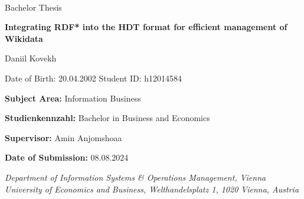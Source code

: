 \AddToShipoutPicture*{\BackgroundPic}
\thispagestyle{fancy}
{\vspace{2cm}~}
{\vspace{2cm}}

{\noindent\large Bachelor Thesis}
\vspace{1cm}

{\noindent\huge\textbf{Integrating RDF* into the HDT format for efficient management of Wikidata}}
\bigskip

{\noindent\LARGE Daniil Kovekh}
\bigskip

{\noindent\small Date of Birth: 20.04.2002}
{\noindent\small Student ID: h12014584}
\bigskip

{\vspace{2cm}}

{\noindent\large {\bf Subject Area:} Information Business}
\bigskip

{\noindent\large {\bf Studienkennzahl:} Bachelor in Business and Economics}
\bigskip

{\noindent\large {\bf Supervisor:} Amin Anjomshoaa}
\bigskip

{\noindent\large {\bf Date of Submission:} 08.08.2024}
\bigskip\bigskip\bigskip\bigskip\bigskip\bigskip

{\em\noindent Department of Information Systems \& Operations Management, Vienna University of
Economics and Business, Welthandelsplatz 1, 1020 Vienna, Austria
}
\pagebreak
